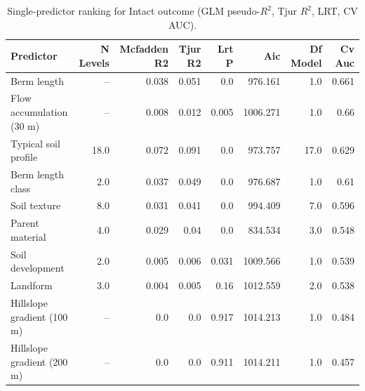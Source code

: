 \documentclass[11pt, a4paper]{article}
\begin{document}
\begin{table}[H]
  \centering
  \caption{Single-predictor ranking for Intact outcome (GLM pseudo-$R^2$, Tjur $R^2$, LRT, CV AUC).}
  \label{tab:si_ranked_intact}
  \small
  \begin{tabular}{lrrrrrrr}
    \toprule
    Predictor & N Levels & Mcfadden R2 & Tjur R2 & Lrt P & Aic & Df Model & Cv Auc \\
    \midrule
    Berm length & -- & 0.038 & 0.051 & 0.0 & 976.161 & 1.0 & 0.661 \\
    Flow accumulation (30 m) & -- & 0.008 & 0.012 & 0.005 & 1006.271 & 1.0 & 0.66 \\
    Typical soil profile & 18.0 & 0.072 & 0.091 & 0.0 & 973.757 & 17.0 & 0.629 \\
    Berm length class & 2.0 & 0.037 & 0.049 & 0.0 & 976.687 & 1.0 & 0.61 \\
    Soil texture & 8.0 & 0.031 & 0.041 & 0.0 & 994.409 & 7.0 & 0.596 \\
    Parent material & 4.0 & 0.029 & 0.04 & 0.0 & 834.534 & 3.0 & 0.548 \\
    Soil development & 2.0 & 0.005 & 0.006 & 0.031 & 1009.566 & 1.0 & 0.539 \\
    Landform & 3.0 & 0.004 & 0.005 & 0.16 & 1012.559 & 2.0 & 0.538 \\
    Hillslope gradient (100 m) & -- & 0.0 & 0.0 & 0.917 & 1014.213 & 1.0 & 0.484 \\
    Hillslope gradient (200 m) & -- & 0.0 & 0.0 & 0.911 & 1014.211 & 1.0 & 0.457 \\
    \bottomrule
  \end{tabular}
\end{table}

\vspace{2em}
\end{document}
